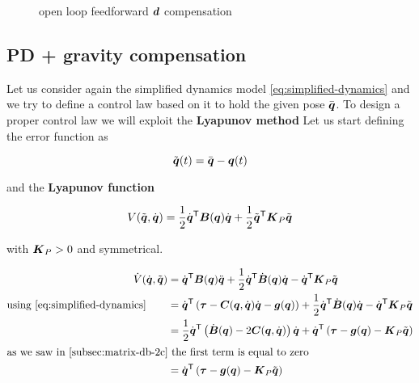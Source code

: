 \begin{figure}[htb]
{
	}
	\caption{open loop feedforward $\boldsymbol{d}$ compensation}
	\label{fig:open-loop}
\end{figure}

\subsection{PD + gravity compensation}

Let us consider again the simplified dynamics model \autoref{eq:simplified-dynamics} and we try to define a control law based on it to hold the given pose $\bar {\boldsymbol{q}}$.
To design a proper control law we will exploit the \textbf{Lyapunov method}
Let us start defining the error function as

\[
	\tilde{\boldsymbol{q}}(t) = \bar {\boldsymbol{q}} - \boldsymbol{q}(t)
\]

and the \textbf{Lyapunov function}

\[
	V(\tilde{\boldsymbol{q}}, \dot{\boldsymbol{q}}) = \frac{1}{2} \dot{\boldsymbol{q}}^{\mathsf{T}} \boldsymbol{B}(\boldsymbol{q}) \dot{\boldsymbol{q}} + \frac{1}{2} \tilde{\boldsymbol{q}}^{\mathsf{T}} \boldsymbol{K}_P \tilde{\boldsymbol{q}}
\]

with $\boldsymbol{K}_P > 0$ and symmetrical.

\begin{align*}
    \dot V(\dq, \qe) &= \dq^\trans \matr B(\q) \ddq + \frac{1}{2} \dq^\trans \dot{\matr B}(\q) \dq - \dq^\trans \matr K_P \tilde \q \\
	\text{using \ref{eq:simplified-dynamics}}\qquad
    &= \dq^\trans \left( \vect \tau - \matr C(\q,\dq)\dq -\vect g(\q) \right) + \frac{1}{2} \dq^\trans \dot{\matr B}(\q) \dq - \dq^\trans \matr K_P \tilde \q \\
	&= \frac{1}{2} \dq^\trans \left( \dot{\matr B}(\q) - 2\matr C(\q,\dq) \right) \dq + \dq^\trans \left( \vect \tau -\vect g(\q) - \matr K_P \tilde \q \right) \\
	\intertext{as we saw in \autoref{subsec:matrix-db-2c} the first term is equal to zero}
    &= \dq^\trans \left( \vect \tau -\vect g(\q) - \matr K_P \tilde \q \right)
\end{align*}

